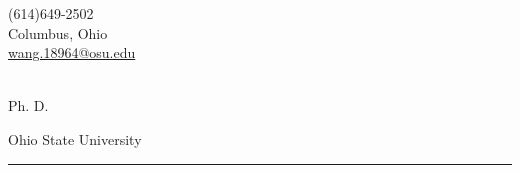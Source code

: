 \begin{center}
    \author{Huaijin Wang}
    \def\role{Ph. D.}
	\begin{minipage}[b]{.3\textwidth}
	\raggedright
	{\large (614)649-2502} \\ %
	{Columbus, Ohio} \\ %
	\def\email{wang.18964@osu.edu}
	\href{mailto:\email}{\email} %
	\end{minipage}%
	\begin{minipage}[b]{.4\textwidth}
	\makeatletter
	\centering {\HUGE \@author} \\
	\makeatother
    \vspace{.5em}
    {\color{highlight} \Large{\role}}
	\end{minipage}%
	\begin{minipage}[b]{.3\textwidth}
	\raggedleft
    Ohio State University \\ %
	\end{minipage}

{\color{highlight} \hrule}
\end{center}
